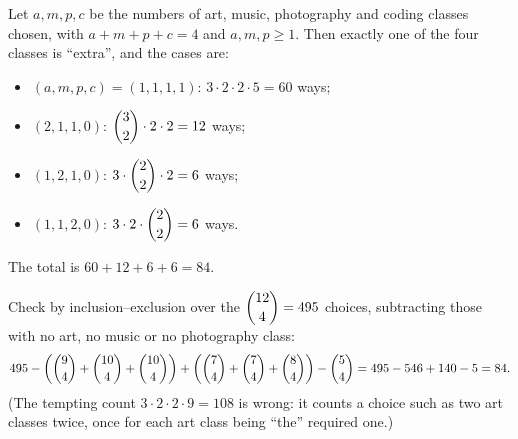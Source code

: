 Let $a,m,p,c$ be the numbers of art, music, photography and coding classes chosen, with $a+m+p+c=4$ and $a,m,p\ge1$. Then exactly one of the four classes is ``extra'', and the cases are:
\begin{itemize}
\item $(a,m,p,c)=(1,1,1,1)$: $3\cdot2\cdot2\cdot5=60$ ways;
\item $(2,1,1,0)$: $\dbinom32\cdot2\cdot2=12$ ways;
\item $(1,2,1,0)$: $3\cdot\dbinom22\cdot2=6$ ways;
\item $(1,1,2,0)$: $3\cdot2\cdot\dbinom22=6$ ways.
\end{itemize}
The total is $60+12+6+6=\boxed{84}$.

Check by inclusion--exclusion over the $\dbinom{12}{4}=495$ choices, subtracting those with no art, no music or no photography class:
\[495-\left(\dbinom94+\dbinom{10}4+\dbinom{10}4\right)+\left(\dbinom74+\dbinom74+\dbinom84\right)-\dbinom54=495-546+140-5=84.\]
(The tempting count $3\cdot2\cdot2\cdot9=108$ is wrong: it counts a choice such as two art classes twice, once for each art class being ``the'' required one.)
